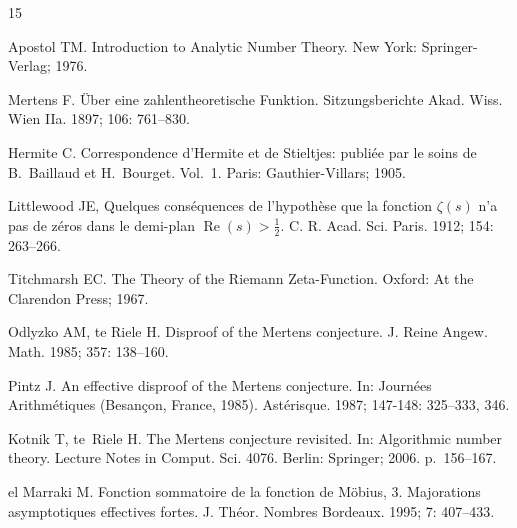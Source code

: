 \documentclass[10pt]{amsart}
\begin{document}
\begin{thebibliography}{15}


{Apostol TM}.
{Introduction to Analytic Number Theory}.
New York: Springer-Verlag; 1976.

{Mertens F}.
{\"Uber eine zahlentheoretische Funktion}.
{Sitzungsberichte Akad. Wiss. Wien IIa}. 
1897; {106}: 761--830.

{Hermite C}. 
{Correspondence d'Hermite et de Stieltjes: publi\'ee par le soins de B.~Baillaud et H.~Bourget}. Vol.~1. 
Paris: Gauthier-Villars; 1905. 

{Littlewood JE},
{Quelques cons\'equences de l'hypoth\`ese que la fonction $\zeta(s)$
n'a pas de z\'eros dans le demi-plan $\operatorname{Re}(s)>\frac 12$}.
{C. R. Acad. Sci. Paris}. 
1912; {154}: 263--266.

{Titchmarsh EC}.
{The Theory of the Riemann Zeta-Function}.
Oxford: At the Clarendon Press; 1967.

{Odlyzko AM, te Riele H}.
{Disproof of the Mertens conjecture}.
{J. Reine Angew. Math.} 
1985; {357}: 138--160.

{Pintz J}.
{An effective disproof of the Mertens conjecture}.
In: {Journ\'ees Arithm\'etiques} (Besan\c{c}on, France, 1985).
{Ast\'erisque}. 
1987; {147-148}: 325--333, 346.

{Kotnik T, te~Riele H}. 
{The Mertens conjecture revisited}. 
In: {Algorithmic number theory}.
{Lecture Notes in Comput. Sci.} {4076}. 
Berlin: Springer; 2006. p.~156--167.

{el Marraki M}.  
{Fonction sommatoire de la fonction de M\"obius, 3. Majorations asymptotiques effectives fortes}.
{J. Th\'eor. Nombres Bordeaux}. %
1995; {7}: 407--433.


\end{thebibliography}
\end{document}
